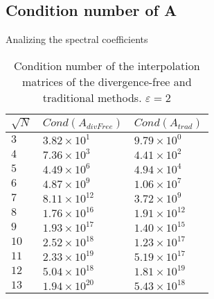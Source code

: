 \documentclass{beamer}
\begin{document}
\subsection{Condition number of A}
\begin{frame}{Analizing the spectral coefficients}
  \begin{table}[hptb]
    \begin{center}
      \begin{tabular}{l||l|l}
        \multicolumn{1}{c||}{$\sqrt{N}$} & 
	\multicolumn{1}{c|}{$Cond(A_{divFree})$} & 
	\multicolumn{1}{c}{$Cond(A_{trad})$} \\
        \hline \hline
        $3$ & $3.82\times 10^{1}$ & $9.79\times 10^{0}$ \\
        $4$ & $7.36\times 10^{3}$ & $4.41\times 10^{2}$ \\
        $5$ & $4.49\times 10^{6}$ & $4.94\times 10^{4}$ \\
        $6$ & $4.87\times 10^{9}$ & $1.06\times 10^{7}$ \\
        $7$ & $8.11\times 10^{12}$ & $3.72\times 10^{9}$ \\
        $8$ & $1.76\times 10^{16}$ & $1.91\times 10^{12}$ \\
        $9$ & $1.93\times 10^{17}$ & $1.40\times 10^{15}$ \\
        $10$ & $2.52\times 10^{18}$ & $1.23\times 10^{17}$ \\
        $11$ & $2.33\times 10^{19}$ & $5.19\times 10^{17}$ \\
        $12$ & $5.04\times 10^{18}$ & $1.81\times 10^{19}$ \\
        $13$ & $1.94\times 10^{20}$ & $5.43\times 10^{18}$ \\
    \end{tabular}
    \end{center}
    \caption{Condition number of the interpolation matrices of the 
    divergence-free and traditional methods. $\varepsilon = 2$}
  \end{table}
\end{frame}
\end{document}
